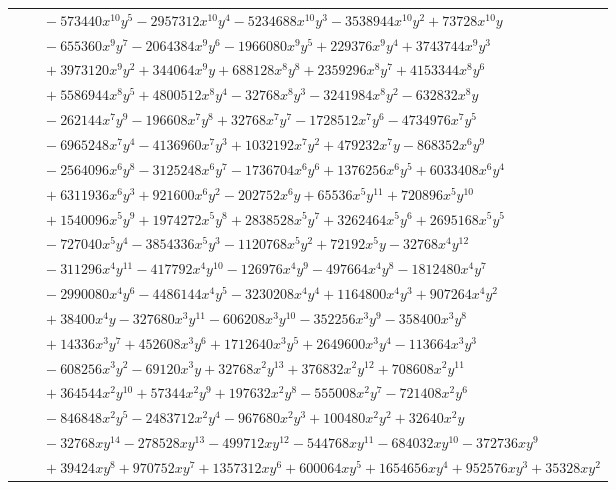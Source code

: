 \documentclass[11pt]{article}
\begin{document}
\begin{longtable}{@{}ll@{}}
 & $\quad -573440x^{10}y^{5}-2957312x^{10}y^{4}-5234688x^{10}y^{3}-3538944x^{10}y^{2}+73728x^{10}y$\\
 & $\quad -655360x^{9}y^{7}-2064384x^{9}y^{6}-1966080x^{9}y^{5}+229376x^{9}y^{4}+3743744x^{9}y^{3}$\\
 & $\quad +3973120x^{9}y^{2}+344064x^{9}y+688128x^{8}y^{8}+2359296x^{8}y^{7}+4153344x^{8}y^{6}$\\
 & $\quad +5586944x^{8}y^{5}+4800512x^{8}y^{4}-32768x^{8}y^{3}-3241984x^{8}y^{2}-632832x^{8}y$\\
 & $\quad -262144x^{7}y^{9}-196608x^{7}y^{8}+32768x^{7}y^{7}-1728512x^{7}y^{6}-4734976x^{7}y^{5}$\\
 & $\quad -6965248x^{7}y^{4}-4136960x^{7}y^{3}+1032192x^{7}y^{2}+479232x^{7}y-868352x^{6}y^{9}$\\
 & $\quad -2564096x^{6}y^{8}-3125248x^{6}y^{7}-1736704x^{6}y^{6}+1376256x^{6}y^{5}+6033408x^{6}y^{4}$\\
 & $\quad +6311936x^{6}y^{3}+921600x^{6}y^{2}-202752x^{6}y+65536x^{5}y^{11}+720896x^{5}y^{10}$\\
 & $\quad +1540096x^{5}y^{9}+1974272x^{5}y^{8}+2838528x^{5}y^{7}+3262464x^{5}y^{6}+2695168x^{5}y^{5}$\\
 & $\quad -727040x^{5}y^{4}-3854336x^{5}y^{3}-1120768x^{5}y^{2}+72192x^{5}y-32768x^{4}y^{12}$\\
 & $\quad -311296x^{4}y^{11}-417792x^{4}y^{10}-126976x^{4}y^{9}-497664x^{4}y^{8}-1812480x^{4}y^{7}$\\
 & $\quad -2990080x^{4}y^{6}-4486144x^{4}y^{5}-3230208x^{4}y^{4}+1164800x^{4}y^{3}+907264x^{4}y^{2}$\\
 & $\quad +38400x^{4}y-327680x^{3}y^{11}-606208x^{3}y^{10}-352256x^{3}y^{9}-358400x^{3}y^{8}$\\
 & $\quad +14336x^{3}y^{7}+452608x^{3}y^{6}+1712640x^{3}y^{5}+2649600x^{3}y^{4}-113664x^{3}y^{3}$\\
 & $\quad -608256x^{3}y^{2}-69120x^{3}y+32768x^{2}y^{13}+376832x^{2}y^{12}+708608x^{2}y^{11}$\\
 & $\quad +364544x^{2}y^{10}+57344x^{2}y^{9}+197632x^{2}y^{8}-555008x^{2}y^{7}-721408x^{2}y^{6}$\\
 & $\quad -846848x^{2}y^{5}-2483712x^{2}y^{4}-967680x^{2}y^{3}+100480x^{2}y^{2}+32640x^{2}y$\\
 & $\quad -32768xy^{14}-278528xy^{13}-499712xy^{12}-544768xy^{11}-684032xy^{10}-372736xy^{9}$\\
 & $\quad +39424xy^{8}+970752xy^{7}+1357312xy^{6}+600064xy^{5}+1654656xy^{4}+952576xy^{3}+35328xy^{2}$\\

\end{longtable}
\end{document}
